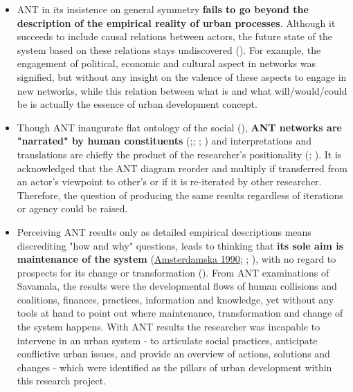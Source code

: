 \documentclass[11pt]{report}
\begin{document}
{{{\begin{itemize}
\item ANT in its insistence on general symmetry \textbf{fails to go beyond the description of the empirical reality of urban processes}. Although it succeeds to include causal relations between actors, the future state of the system based on these relations stays undiscovered (\href{ref}{\citealt{elder-vass_searching_2008}}). For example, the engagement of political, economic and cultural aspect in networks was signified, but without any insight on the valence of these aspects to engage in new networks, while this relation between what is and what will/would/could be is actually the essence of urban development concept.

\item Though ANT inaugurate flat ontology of the social (\href{ref}{\citealt{latour_reassembling_2005}}), \textbf{ANT networks are "narrated" by human constituents} (\href{ref}{\citealt{pickering_epistemological_1992}};\href{ref}{\citealt{czarniawska_narrating_1997}}; \href{ref}{\citealt{whittle_is_2008}};  \href{ref}{\citealt{marshall_mapping_2015}}) and interpretations and translations are chiefly the product of the researcher's positionality  (\href{ref}{\citealt{rose_situating_1997}}; \href{ref}{\citealt{ruming_following_2009}}). It is acknowledged that the ANT diagram reorder and multiply if transferred from an actor’s viewpoint to other’s or if it is re-iterated by other researcher. Therefore, the question of producing the same results regardless of iterations or agency could be raised.

\item Perceiving ANT results only as detailed empirical descriptions means discrediting "how and why" questions, leads to thinking that \textbf{its sole aim is maintenance of the system} (\href{ref}{Amsterdamska 1990}; \cite{Lee and Brown 1994}; \href{ref}{\citealt{lee_otherness_1994}}), with no regard to prospects for its change or transformation (\href{ref}{\citealt{gabriel_post-social_2008}}).
From ANT examinations of Savamala, the results were the developmental flows of human collisions and coalitions, finances, practices, information and knowledge, yet without any tools at hand to point out where maintenance, transformation and change of the system happens.
With ANT results the researcher was incapable to intervene in an urban system - to articulate social practices, anticipate conflictive urban issues, and provide an overview of actions, solutions and changes - which were identified as the pillars of urban development within this research project.
\end{itemize}
 
}}}
\end{document}
